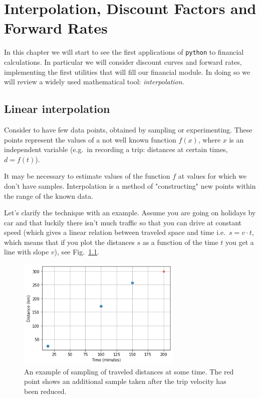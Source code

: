 \chapter{Interpolation, Discount Factors and Forward Rates}\label{interpolation---practical-lesson-3}

In this chapter we will start to see the first applications of \texttt{python} to financial calculations.
In particular we will consider discount curves and forward rates, implementing the first utilities that will fill our financial module.
In doing so we will review a widely used mathematical tool: \emph{interpolation}.

\section{Linear interpolation}\label{linear-interpolation}

Consider to have few data points, obtained by sampling or experimenting. These points represent the values of a not well known function \(f(x)\), where \(x\) is an independent variable (e.g.~in recording a trip: distances at certain times, \(d = f(t)\)).

It may be necessary to estimate values of the function $f$ at values for which we don't have samples.
Interpolation is a method of "constructing" new points within the range of the known data.

Let's clarify the technique with an example.
Assume you are going on holidays by car and that luckily there isn't much traffic so that you can drive at constant speed (which gives a linear relation between traveled space and time i.e.~\(s = v \cdot t\), which means that if you plot the distances \(s\) as a function of the time \(t\) you get a line with slope \(v\)), see Fig.~\ref{fig:samples_for_interpolation}.

\begin{figure}
  \centering
  \includegraphics[width=0.7\textwidth]{interp_example1.png}
  \caption{An example of sampling of traveled distances at some time. The red point shows an additional sample taken after the trip velocity has been reduced.}
  \label{fig:samples_for_interpolation}
\end{figure}

